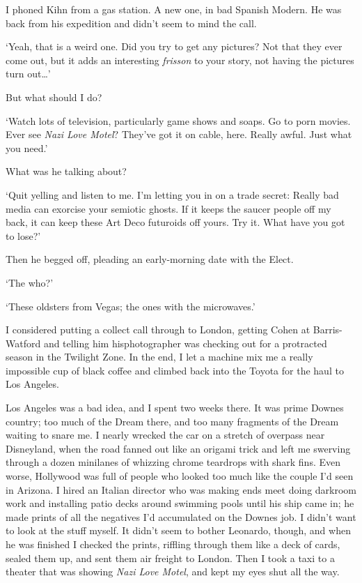 I phoned Kihn from a gas station. A new one, in bad Spanish Modern. He was back from his expedition and didn't seem to mind the call.

`Yeah, that is a weird one. Did you try to get any pictures? Not that they ever come out, but it adds an interesting \textit{frisson} to your story, not having the pictures turn out\ldots'

But what should I do?

`Watch lots of television, particularly game shows and soaps. Go to porn movies. Ever see \textit{Nazi Love Motel}? They've got it on cable, here. Really awful. Just what you need.'

What was he talking about?

`Quit yelling and listen to me. I'm letting you in on a trade secret: Really bad media can exorcise your semiotic ghosts. If it keeps the saucer people off my back, it can keep these Art Deco futuroids off yours. Try it. What have you got to lose?'

Then he begged off, pleading an early-morning date with the Elect.

`The who?'

`These oldsters from Vegas; the ones with the microwaves.'

I considered putting a collect call through to London, getting Cohen at Barris-Watford and telling him hisphotographer was checking out for a protracted season in the Twilight Zone. In the end, I let a machine mix me a really impossible cup of black coffee and climbed back into the Toyota for the haul to Los Angeles.

Los Angeles was a bad idea, and I spent two weeks there. It was prime Downes country; too much of the Dream there, and too many fragments of the Dream waiting to snare me. I nearly wrecked the car on a stretch of overpass near Disneyland, when the road fanned out like an origami trick and left me swerving through a dozen minilanes of whizzing chrome teardrops with shark fins. Even worse, Hollywood was full of people who looked too much like the couple I'd seen in Arizona. I hired an Italian director who was making ends meet doing darkroom work and installing patio decks around swimming pools until his ship came in; he made prints of all the negatives I'd accumulated on the Downes job. I didn't want to look at the stuff myself. It didn't seem to bother Leonardo, though, and when he was finished I checked the prints, riffling through them like a deck of cards, sealed them up, and sent them air freight to London. Then I took a taxi to a theater that was showing \textit{Nazi Love Motel}, and kept my eyes shut all the way.

